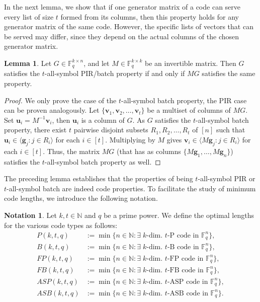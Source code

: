 \documentclass[11pt,a4paper]{article}
\theoremstyle{definition}
\newtheorem{notation}[theorem]{Notation}
\newtheorem{lemma}[theorem]{Lemma}
\newcommand{\bfg}{{\boldsymbol g}}
\newcommand{\bfu}{{\boldsymbol u}}
\newcommand{\bfv}{{\boldsymbol v}}
\newcommand{\F}{\mathbb{F}}
\newcommand{\N}{\mathbb{N}}
\begin{document}
In the next lemma, we show that if one generator matrix of a code can serve every list of size $t$ formed from its columns, then this property holds for any generator matrix of the same code. However, the specific lists of vectors that can be served may differ, since they depend on the actual columns of the chosen generator matrix. 

\begin{lemma}\label{Invariance_Of_Mul_By_Invertible}
    Let $G \in \F_q^{k \times n}$, and let $M \in \F_q^{k \times k}$ be an invertible matrix. Then $G$ satisfies the $t$-all-symbol PIR/batch property if and only if $MG$ satisfies the same property.
\end{lemma}
\begin{proof}
   We only prove the case of the $t$-all-symbol batch property, the PIR case can be proven analogously. Let $\{\bfv_{1},\bfv_{2},\ldots,\bfv_{t}\}$ be a multiset of columns of $MG$. Set $\bfu_i=M^{-1}\bfv_i$, then $\bfu_i$ is a column of $G$. As $G$ satisfies the $t$-all-symbol batch property, there exist $t$ pairwise disjoint subsets $R_1,R_2,\ldots,R_t$ of $[n]$ such that $\bfu_i\in \langle \bfg_j : j \in R_i\rangle$ for each $i\in[t]$. Multiplying by $M$ gives $\bfv_i\in \langle M\bfg_j : j \in R_i \rangle$ for each $i\in[t]$. Thus, the matrix $MG$ (that has as columns $\{M\bfg_1,\dots,M\bfg_n\}$) satisfies the $t$-all-symbol batch property as well.
\end{proof}

The preceding lemma establishes that the properties of being $t$-all-symbol PIR or $t$-all-symbol batch are indeed code properties. To facilitate the study of minimum code lengths, we introduce the following notation.

\begin{notation} \label{not:mins}
Let $k, t \in \N$ and $q$ be a prime power. We define the 
optimal lengths for the various code types as follows:
\begin{align*}
    P(k,t,q)&:=\min\{n\in \N : \exists \; k\text{-dim. }t\text{-P code in $\F_q^n$}\}, \\
    B(k,t,q)&:=\min\{n\in \N : \exists \;  k\text{-dim. }t\text{-B code in $\F_q^n$}\}, \\
    FP(k,t,q)&:=\min\{n\in \N : \exists \;  k\text{-dim. }t\text{-FP code in $\F_q^n$}\}, \\
    FB(k,t,q)&:=\min\{n\in \N : \exists \; k\text{-dim. }t\text{-FB code in $\F_q^n$}\}, \\
    ASP(k,t,q)&:=\min\{n\in \N : \exists \;  k\text{-dim. }t\text{-ASP code in $\F_q^n$}\}, \\
    ASB(k,t,q)&:=\min\{n\in \N : \exists \;  k\text{-dim. }t\text{-ASB code in $\F_q^n$}\}.
\end{align*}
\end{notation}
\end{document}
